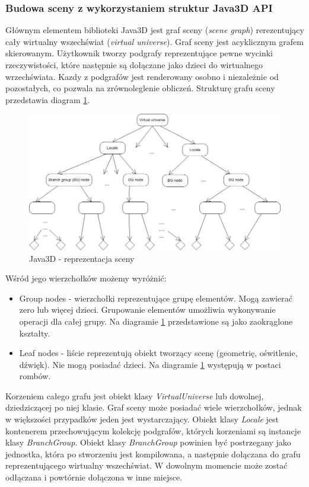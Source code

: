 \subsubsection{Budowa sceny z wykorzystaniem struktur Java3D API}
Głównym elementem biblioteki Java3D jest graf sceny (\textit{scene graph}) rerezentujący cały wirtualny wszechświat (\textit{virtual universe}). Graf sceny jest acyklicznym grafem skierowanym.  Użytkownik tworzy podgrafy reprezentujące pewne wycinki rzeczywistości, które następnie są dołączane jako dzieci do wirtualnego wrzechświata. Kazdy z podgrafów jest renderowany  osobno i niezależnie od pozostałych, co pozwala na zrównoleglenie obliczeń. Strukturę grafu sceny przedstawia diagram \ref{java3d_diagram_sceny}.
\begin{figure}
\begin {center}
\includegraphics{java3d_diagram_sceny.jpg} 
\caption {Java3D - reprezentacja sceny}
\label {java3d_diagram_sceny}
\end {center}
\end{figure}
 Wśród jego wierzchołków możemy wyróżnić:
\begin{itemize}
\item Group nodes - wierzchołki reprezentujące grupę elementów. Mogą zawierać zero lub więcej dzieci. Grupowanie elementów umożliwia wykonywanie operacji dla całej grupy. Na diagramie \ref{java3d_diagram_sceny} przedstawione są jako zaokrąglone kształty.
\item Leaf nodes - liście reprezentują obiekt tworzący scenę (geometrię, oświtlenie, dźwięk). Nie mogą posiadać dzieci. Na diagramie \ref{java3d_diagram_sceny} występują w postaci rombów.
\end{itemize}
Korzeniem całego grafu jest obiekt klasy \textit{VirtualUniverse} lub dowolnej, dziedziczącej po niej klasie. Graf sceny może posiadać wiele wierzchołków, jednak w większości przypadków jeden jest wystarczający. Obiekt klasy \textit{Locale} jest kontenerem przechowującym kolekcję podgrafów, których korzeniami są instancje klasy \textit {BranchGroup}. Obiekt klasy \textit{BranchGroup} powinien być postrzegany jako jednostka, która po stworzeniu jest kompilowana, a następnie dołączana do grafu reprezentującego wirtualny wszechświat. W dowolnym momencie może zostać odłączana i powtórnie dołączona w inne miejsce.
